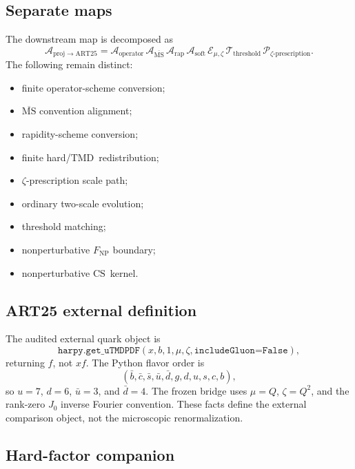 \documentclass[11pt]{article}
\newcommand{\TMD}{\ensuremath{\mathrm{TMD}}}
\newcommand{\CS}{\ensuremath{\mathrm{CS}}}
\newcommand{\cT}{\mathcal T}
\newcommand{\cA}{\mathcal A}
\newcommand{\cE}{\mathcal E}
\newcommand{\cP}{\mathcal P}
\newcommand{\Proj}{\ensuremath{\mathrm{proj}}}
\newcommand{\ART}{\ensuremath{\mathrm{ART25}}}
\begin{document}
\subsection{Separate maps}

The downstream map is decomposed as
\begin{equation}
 \cA_{\Proj\to\ART}
 =
 \cA_{\mathrm{operator}}\,
 \cA_{\overline{\mathrm{MS}}}\,
 \cA_{\mathrm{rap}}\,
 \cA_{\mathrm{soft}}\,
 \cE_{\mu,\zeta}\,
 \cT_{\mathrm{threshold}}\,
 \cP_{\zeta\text{-prescription}}.
 \label{eq:adapter-decomposition}
\end{equation}
The following remain distinct:
\begin{itemize}
\item finite operator-scheme conversion;
\item \(\overline{\mathrm{MS}}\) convention alignment;
\item rapidity-scheme conversion;
\item finite hard/\TMD\ redistribution;
\item \(\zeta\)-prescription scale path;
\item ordinary two-scale evolution;
\item threshold matching;
\item nonperturbative \(F_{\mathrm{NP}}\) boundary;
\item nonperturbative \CS\ kernel.
\end{itemize}

\subsection{ART25 external definition}

The audited external quark object is
\begin{equation}
 \texttt{harpy.get\_uTMDPDF}(x,b,1,\mu,\zeta,\texttt{includeGluon=False}),
 \label{eq:art25-call}
\end{equation}
returning \(f\), not \(xf\).  The Python flavor order is
\begin{equation}
 (\bar b,\bar c,\bar s,\bar u,\bar d,g,d,u,s,c,b),
 \label{eq:art25-order}
\end{equation}
so \(u=7\), \(d=6\), \(\bar u=3\), and \(\bar d=4\).  The frozen bridge uses \(\mu=Q\), \(\zeta=Q^2\), and the rank-zero \(J_0\) inverse Fourier convention.  These facts define the external comparison object, not the microscopic renormalization.

\subsection{Hard-factor companion}
\end{document}
